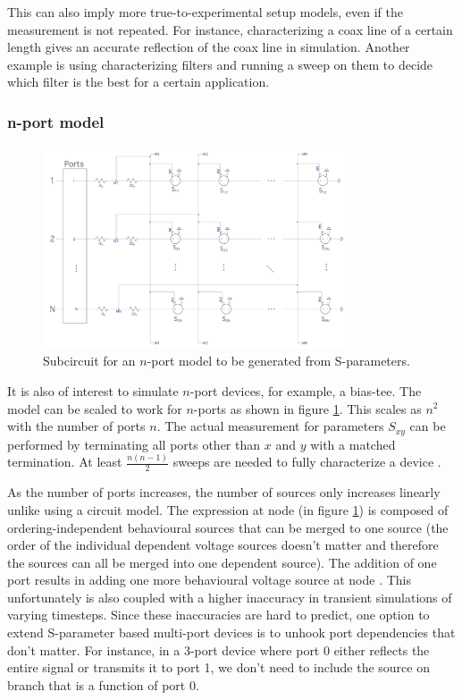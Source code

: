 This can also imply more true-to-experimental setup models, even if the measurement is not repeated.
For instance, characterizing a coax line of a certain length gives an accurate reflection of the coax line
in simulation. Another example is using characterizing filters and running a sweep on them to
decide which filter is the best for a certain application.

\subsubsection{n-port model}

\begin{figure}
    \centering
    \includegraphics[width=0.8\textwidth]{figs/nport.png}
    \caption{Subcircuit for an $n$-port model to be generated from S-parameters.}
    \label{fig:nport}
\end{figure}

It is also of interest to simulate $n$-port devices, for example, a bias-tee. 
The model can be
scaled to work for $n$-ports as shown in figure \ref{fig:nport}. This scales as $n^2$ with
the number of ports $n$. The actual measurement for parameters $S_{xy}$ can be performed 
by terminating all ports other than $x$ and $y$ with a matched termination. At least
$\frac{n(n-1)}{2}$ sweeps are needed to fully characterize a device \cite{measuring_nport}.

As the number of
ports increases, the number of sources only increases linearly unlike using a circuit 
model. The expression at node  (in figure \ref{fig:nport}) is composed of 
ordering-independent behavioural
sources that can be merged to one source (the order of the individual dependent voltage sources doesn't 
matter and 
therefore the sources can all be merged into one dependent source). The addition of one port results in
adding one more behavioural voltage source at node . 
This unfortunately is also coupled with a higher inaccuracy in transient simulations
of varying timesteps. Since these inaccuracies are hard to predict, one option to
extend S-parameter based multi-port devices is to unhook port dependencies that don't
matter. For instance, in a 3-port device where port 0 either reflects the entire
signal or transmits it to port 1, we don't need to include the source on branch 
that is a function of port 0.

